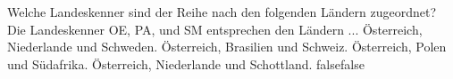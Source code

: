     {Welche Landeskenner sind der Reihe nach den folgenden Ländern zugeordnet? Die Landeskenner OE, PA, und SM entsprechen den Ländern ...}
    {Österreich, Niederlande und Schweden.}
    {Österreich, Brasilien und Schweiz.}
    {Österreich, Polen und Südafrika.}
    {Österreich, Niederlande und Schottland.}
    {false}{false}